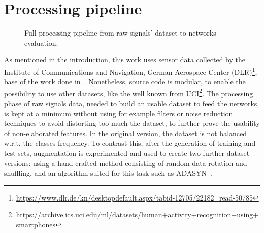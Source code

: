 
\section{Processing pipeline}\label{sec:processing_pipeline}

\begin{figure*}
    \centering
        \vspace{14mm}
    \caption{Full processing pipeline from raw signals' dataset to networks evaluation.}
    \label{fig:full_proc}
\end{figure*}

As mentioned in the introduction, this work uses sensor data collected by the Institute of Communications and Navigation, German Aerospace Center (DLR)\footnote{\url{https://www.dlr.de/kn/desktopdefault.aspx/tabid-12705/22182_read-50785}}, base of the work done in~\cite{FrankNadales}.
Nonetheless, source code is modular, to enable the possibility to use other datasets, like the well known from UCI\footnote{\url{https://archive.ics.uci.edu/ml/datasets/human+activity+recognition+using+smartphones}}.
The processing phase of raw signals data, needed to build an usable dataset to feed the networks, is kept at a minimum without using for example filters or noise reduction techniques to avoid distorting too much the dataset, to further prove the usability of non-elaborated features. In the original version, the dataset is not balanced w.r.t. the classes frequency.
To contrast this, after the generation of training and test sets, augmentation is experimented and used to create two further dataset versions: using a hand-crafted method consisting of random data rotation and shuffling, and an algorithm suited for this task such as ADASYN~\cite{He-ADASYN}.


